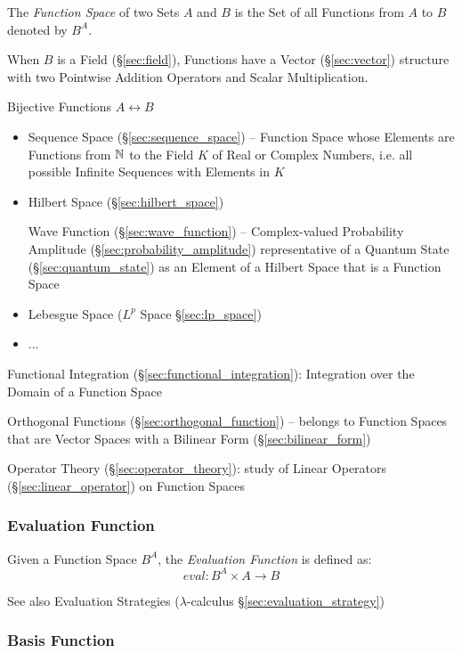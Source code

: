 The \emph{Function Space} of two Sets $A$ and $B$ is the Set of all Functions
from $A$ to $B$ denoted by $B^A$.

When $B$ is a Field (\S\ref{sec:field}), Functions have a Vector
(\S\ref{sec:vector}) structure with two Pointwise Addition Operators and Scalar
Multiplication. %

Bijective Functions $A \leftrightarrow B$

\begin{itemize}
  \item Sequence Space (\S\ref{sec:sequence_space}) -- Function Space whose
    Elements are Functions from $\mathbb{N}$ to the Field $K$ of Real or Complex
    Numbers, i.e. all possible Infinite Sequences with Elements in $K$
  \item Hilbert Space (\S\ref{sec:hilbert_space})

    \fist Wave Function (\S\ref{sec:wave_function}) -- Complex-valued
    Probability Amplitude (\S\ref{sec:probability_amplitude}) representative of
    a Quantum State (\S\ref{sec:quantum_state}) as an Element of a Hilbert Space
    that is a Function Space
  \item Lebesgue Space ($L^p$ Space \S\ref{sec:lp_space})
  \item ...
\end{itemize}

\fist Functional Integration (\S\ref{sec:functional_integration}): Integration
over the Domain of a Function Space

\fist Orthogonal Functions (\S\ref{sec:orthogonal_function}) -- belongs to
Function Spaces that are Vector Spaces with a Bilinear Form
(\S\ref{sec:bilinear_form})

\fist Operator Theory (\S\ref{sec:operator_theory}): study of Linear Operators
(\S\ref{sec:linear_operator}) on Function Spaces



\subsubsection{Evaluation Function}\label{sec:evaluation_function}

Given a Function Space $B^A$, the \emph{Evaluation Function} is
defined as:
\[
  eval : B^A \times A \to B
\]

\fist See also Evaluation Strategies ($\lambda$-calculus
\S\ref{sec:evaluation_strategy})



\subsubsection{Basis Function}\label{sec:basis_function}

